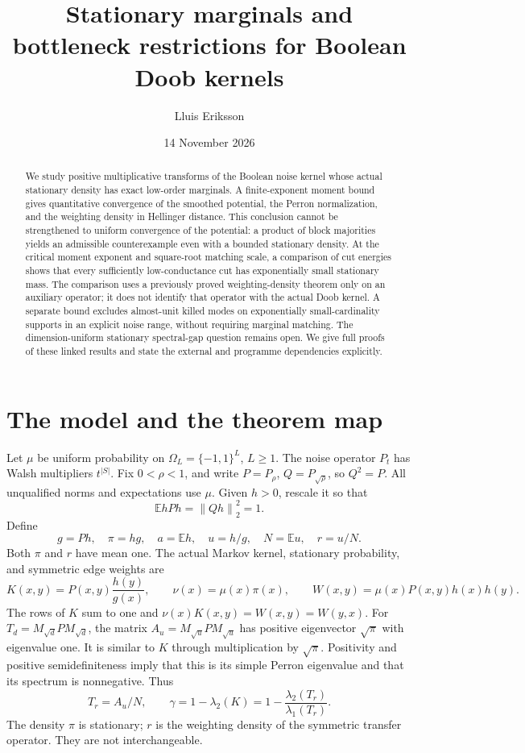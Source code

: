 \documentclass[11pt]{article}
\title{Stationary marginals and bottleneck restrictions for Boolean Doob kernels}
\author{Lluis Eriksson}
\date{14 November 2026}
\newcommand{\E}{\mathbb E}
\newcommand{\norm}[1]{\left\|#1\right\|}
\begin{document}
\maketitle
\begin{abstract}
We study positive multiplicative transforms of the Boolean noise kernel whose actual stationary density has exact low-order marginals. A finite-exponent moment bound gives quantitative convergence of the smoothed potential, the Perron normalization, and the weighting density in Hellinger distance. This conclusion cannot be strengthened to uniform convergence of the potential: a product of block majorities yields an admissible counterexample even with a bounded stationary density. At the critical moment exponent and square-root matching scale, a comparison of cut energies shows that every sufficiently low-conductance cut has exponentially small stationary mass. The comparison uses a previously proved weighting-density theorem only on an auxiliary operator; it does not identify that operator with the actual Doob kernel. A separate bound excludes almost-unit killed modes on exponentially small-cardinality supports in an explicit noise range, without requiring marginal matching. The dimension-uniform stationary spectral-gap question remains open. We give full proofs of these linked results and state the external and programme dependencies explicitly.
\end{abstract}

\section{The model and the theorem map}
Let $\mu$ be uniform probability on $\Omega_L=\{-1,1\}^L$, $L\geq1$. The noise operator $P_t$ has Walsh multipliers $t^{|S|}$. Fix $0<\rho<1$, and write $P=P_\rho$, $Q=P_{\sqrt\rho}$, so $Q^2=P$. All unqualified norms and expectations use $\mu$. Given $h>0$, rescale it so that
\[
 \E hPh=\norm{Qh}_2^2=1.
\]
Define
\[
 g=Ph,\quad \pi=hg,\quad a=\E h,\quad
 u=h/g,\quad N=\E u,\quad r=u/N.
\]
Both $\pi$ and $r$ have mean one. The actual Markov kernel, stationary probability, and symmetric edge weights are
\[
 K(x,y)=P(x,y)\frac{h(y)}{g(x)},\qquad
 \nu(x)=\mu(x)\pi(x),\qquad
 W(x,y)=\mu(x)P(x,y)h(x)h(y).
\]
The rows of $K$ sum to one and $\nu(x)K(x,y)=W(x,y)=W(y,x)$. For $T_d=M_{\sqrt d}PM_{\sqrt d}$, the matrix $A_u=M_{\sqrt u}PM_{\sqrt u}$ has positive eigenvector $\sqrt\pi$ with eigenvalue one. It is similar to $K$ through multiplication by $\sqrt\pi$. Positivity and positive semidefiniteness imply that this is its simple Perron eigenvalue and that its spectrum is nonnegative. Thus
\[
 T_r=A_u/N,\qquad
 \gamma=1-\lambda_2(K)=1-\frac{\lambda_2(T_r)}{\lambda_1(T_r)}.
\]
The density $\pi$ is stationary; $r$ is the weighting density of the symmetric transfer operator. They are not interchangeable.
\end{document}
